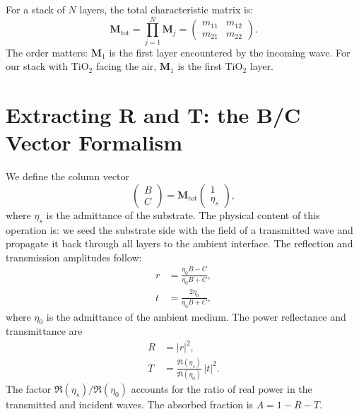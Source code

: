 For a stack of $N$ layers, the total characteristic matrix is:
\begin{equation}
  \bm{M}_\text{tot} = \prod_{j=1}^{N} \bm{M}_j
  = \begin{pmatrix} m_{11} & m_{12} \\ m_{21} & m_{22} \end{pmatrix}.
  \label{eq:ch5_mtot}
\end{equation}
The order matters: $\bm{M}_1$ is the first layer encountered by the incoming
wave. For our stack with TiO$_2$ facing the air, $\bm{M}_1$ is the first
TiO$_2$ layer.

\section{Extracting R and T: the B/C Vector Formalism}

We define the column vector
\begin{equation}
  \begin{pmatrix} B \\ C \end{pmatrix}
  = \bm{M}_\text{tot}
  \begin{pmatrix} 1 \\ \eta_s \end{pmatrix},
  \label{eq:ch5_BC}
\end{equation}
where $\eta_s$ is the admittance of the substrate. The physical content of
this operation is: we seed the substrate side with the field of a transmitted
wave and propagate it back through all layers to the ambient interface. The
reflection and transmission amplitudes follow:
\begin{align}
  r &= \frac{\eta_0 B - C}{\eta_0 B + C},
  \label{eq:ch5_r} \\
  t &= \frac{2\eta_0}{\eta_0 B + C},
  \label{eq:ch5_t}
\end{align}
where $\eta_0$ is the admittance of the ambient medium. The power reflectance
and transmittance are
\begin{align}
  R &= |r|^2,
  \label{eq:ch5_R} \\
  T &= \frac{\Re(\eta_s)}{\Re(\eta_0)}\,|t|^2.
  \label{eq:ch5_T}
\end{align}
The factor $\Re(\eta_s)/\Re(\eta_0)$ accounts for the ratio of real power in
the transmitted and incident waves. The absorbed fraction is $A = 1 - R - T$.

